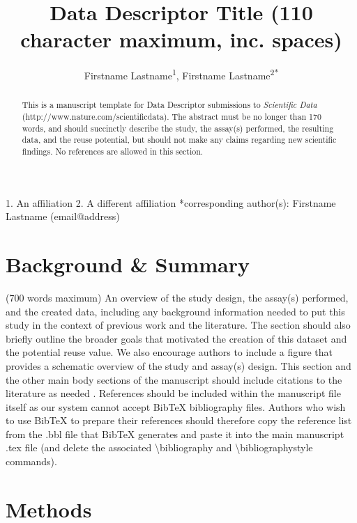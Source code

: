 \documentclass[a4paper,10pt,english]{article}
\begin{document}
\title{Data Descriptor Title (110 character maximum, inc. spaces)}

\author{Firstname Lastname\textsuperscript{1}, Firstname
Lastname\textsuperscript{2{*}}}

\maketitle
\thispagestyle{fancy}

1. An affiliation 2. A different affiliation {*}corresponding author(s):
Firstname Lastname (email@address)
\begin{abstract}
This is a manuscript template for Data Descriptor submissions to \emph{Scientific
Data} (http://www.nature.com/scientificdata). The abstract must be
no longer than 170 words, and should succinctly describe the study,
the assay(s) performed, the resulting data, and the reuse potential,
but should not make any claims regarding new scientific findings.
No references are allowed in this section. 
\end{abstract}

\section*{Background \& Summary}

(700 words maximum) An overview of the study design, the assay(s)
performed, and the created data, including any background information
needed to put this study in the context of previous work and the literature.
The section should also briefly outline the broader goals that motivated
the creation of this dataset and the potential reuse value. We also
encourage authors to include a figure that provides a schematic overview
of the study and assay(s) design. This section and the other main
body sections of the manuscript should include citations to the literature
as needed \cite{cite1, cite2}. References should be included within the 
manuscript file itself as our system cannot accept BibTeX bibliography files. 
Authors who wish to use BibTeX to prepare their references should therefore 
copy the reference list from the .bbl file that BibTeX generates and paste it 
into the main manuscript .tex file (and delete the associated 
\textbackslash{}bibliography and \textbackslash{}bibliographystyle commands).


\section*{Methods}
\end{document}
